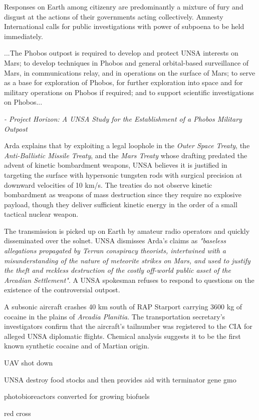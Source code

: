 Responses on Earth among citizenry are predominantly a mixture of fury and disgust at the actions of their governments acting collectively. Amnesty International calls for public investigations with power of subpoena to be held immediately.

\startTimelineGeneralDocument
...The Phobos outpost is required to develop and protect UNSA interests on Mars; to develop techniques in Phobos and general orbital-based surveillance of Mars, in communications relay, and in operations on the surface of Mars; to serve as a base for exploration of Phobos, for further exploration into space and for military operations on Phobos if required; and to support scientific investigations on Phobos...

\hskip 1.5cm {\it - Project Horizon: A UNSA Study for the Establishment of a Phobos Military Outpost}
\stopTimelineGeneralDocument

Arda explains that by exploiting a legal loophole in the {\it Outer Space Treaty}, the {\it Anti-Ballistic Missile Treaty}, and the {\it Mars Treaty} whose drafting predated the advent of kinetic bombardment weapons, UNSA believes it is justified in targeting the surface with hypersonic tungsten rods with surgical precision at downward velocities of 10 km/s. The treaties do not observe kinetic bombardment as weapons of mass destruction since they require no explosive payload, though they deliver sufficient kinetic energy in the order of a small tactical nuclear weapon.

The transmission is picked up on Earth by amateur radio operators and quickly disseminated over the solnet. UNSA dismisses Arda's claims as {\it "baseless allegations propagated by Terran conspiracy theorists, intertwined with a misunderstanding of the nature of meteorite strikes on Mars, and used to justify the theft and reckless destruction of the costly off-world public asset of the Arcadian Settlement"}. A UNSA spokesman refuses to respond to questions on the existence of the controversial outpost.
\StopTimelineDate

A subsonic aircraft crashes 40 km south of RAP Starport carrying 3600 kg of cocaine in the plains of {\it Arcadia Planitia}. The transportation secretary's investigators confirm that the aircraft's tailnumber was registered to the CIA for alleged UNSA diplomatic flights. Chemical analysis suggests it to be the first known synthetic cocaine and of Martian origin.
\StopTimelineDate

UAV shot down

UNSA destroy food stocks and then provides aid with terminator gene gmo

photobioreactors converted for growing biofuels

red cross

